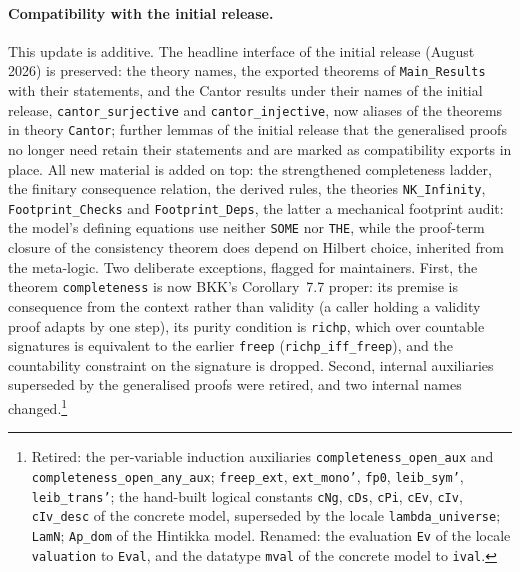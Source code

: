 \documentclass[11pt,a4paper]{article}
\begin{document}
\paragraph{Compatibility with the initial release.}
This update is additive.  The headline interface of the initial release
(August 2026) is preserved: the theory names, the exported theorems of
\texttt{Main\_Results} with their statements, and the Cantor results
under their names of the initial release, \texttt{cantor\_surjective} and
\texttt{cantor\_injective}, now aliases of the theorems in theory
\texttt{Cantor}; further lemmas of the initial release that the generalised proofs
no longer need retain their statements and are marked as
compatibility exports in place.  All new material is added on top: the
strengthened completeness ladder, the finitary consequence relation,
the derived rules, the theories \texttt{NK\_Infinity},
\texttt{Footprint\_Checks} and \texttt{Footprint\_Deps}, the latter a
mechanical footprint audit: the model's defining equations use neither
\texttt{SOME} nor \texttt{THE}, while the proof-term closure of the
consistency theorem does depend on Hilbert choice, inherited from the
meta-logic.  Two deliberate exceptions, flagged for
maintainers.  First, the theorem \texttt{completeness} is now BKK's
Corollary~7.7 proper: its premise is consequence from the context
rather than validity (a caller holding a validity proof adapts by one
step), its purity condition is \texttt{richp}, which over countable
signatures is equivalent to the earlier \texttt{freep}
(\texttt{richp\_iff\_freep}), and the countability constraint on the
signature is dropped.  Second, internal auxiliaries superseded by the
generalised proofs were retired, and two internal names
changed.\footnote{Retired: the per-variable induction auxiliaries
\texttt{completeness\_open\_aux} and \texttt{completeness\_open\_any\_aux};
\texttt{freep\_ext}, \texttt{ext\_mono'}, \texttt{fp0},
\texttt{leib\_sym'}, \texttt{leib\_trans'}; the hand-built logical
constants \texttt{cNg}, \texttt{cDs}, \texttt{cPi}, \texttt{cEv},
\texttt{cIv}, \texttt{cIv\_desc} of the concrete model, superseded by the
locale \texttt{lambda\_universe}; \texttt{LamN}; \texttt{Ap\_dom} of
the Hintikka model.  Renamed: the evaluation \texttt{Ev} of the locale
\texttt{valuation} to \texttt{Eval}, and the datatype \texttt{mval} of
the concrete model to \texttt{ival}.}




\end{document}
